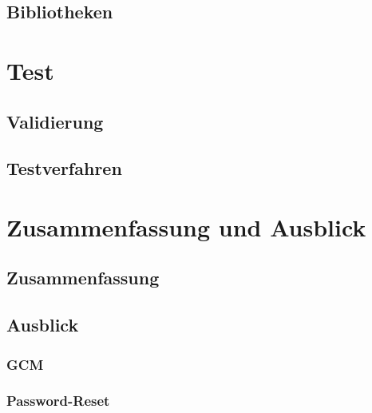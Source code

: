 \documentclass[10pt, a4paper]{scrreprt}
\begin{document}
\section{Bibliotheken}

\chapter{Test}
\section{Validierung}
\section{Testverfahren}

\chapter{Zusammenfassung und Ausblick}
\section{Zusammenfassung}
\section{Ausblick}
\subsection{GCM}
\subsection{Password-Reset}







\printindex


\end{document}
